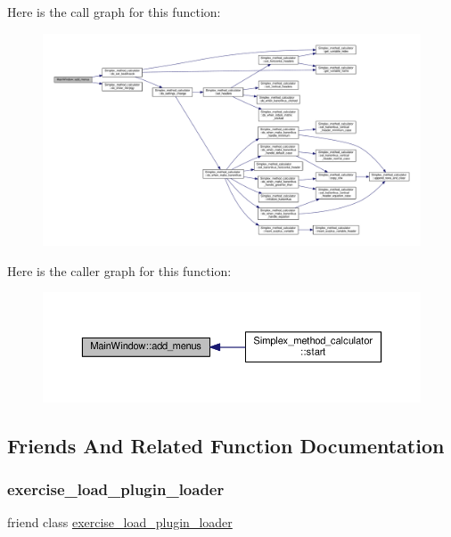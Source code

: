 Here is the call graph for this function\+:\nopagebreak
\begin{figure}[H]
\begin{center}
\leavevmode
\includegraphics[width=350pt]{classMainWindow_a465314c6317877838dfe332838be19b2_cgraph}
\end{center}
\end{figure}
Here is the caller graph for this function\+:\nopagebreak
\begin{figure}[H]
\begin{center}
\leavevmode
\includegraphics[width=350pt]{classMainWindow_a465314c6317877838dfe332838be19b2_icgraph}
\end{center}
\end{figure}


\subsection{Friends And Related Function Documentation}
\mbox{\label{classMainWindow_a2ae02a3574508e653447a544639a0fe0}} 
\subsubsection{\texorpdfstring{exercise\+\_\+load\+\_\+plugin\+\_\+loader}{exercise\_load\_plugin\_loader}}
{\footnotesize\ttfamily friend class \hyperlink{classexercise__load__plugin__loader}{exercise\+\_\+load\+\_\+plugin\+\_\+loader}\hspace{0.3cm}{\ttfamily [friend]}}



